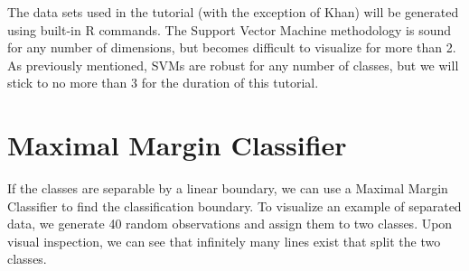 \documentclass[]{book}
\newenvironment{Shaded}{\begin{snugshade}}{\end{snugshade}}
\newcommand{\CommentTok}[1]{\textcolor[rgb]{0.56,0.35,0.01}{\textit{#1}}}
\newcommand{\DataTypeTok}[1]{\textcolor[rgb]{0.13,0.29,0.53}{#1}}
\newcommand{\DecValTok}[1]{\textcolor[rgb]{0.00,0.00,0.81}{#1}}
\newcommand{\FloatTok}[1]{\textcolor[rgb]{0.00,0.00,0.81}{#1}}
\newcommand{\KeywordTok}[1]{\textcolor[rgb]{0.13,0.29,0.53}{\textbf{#1}}}
\newcommand{\NormalTok}[1]{#1}
\newcommand{\OperatorTok}[1]{\textcolor[rgb]{0.81,0.36,0.00}{\textbf{#1}}}
\newcommand{\StringTok}[1]{\textcolor[rgb]{0.31,0.60,0.02}{#1}}
\begin{document}
The data sets used in the tutorial (with the exception of Khan) will be generated using built-in R commands. The Support Vector Machine methodology is sound for any number of dimensions, but becomes difficult to visualize for more than 2. As previously mentioned, SVMs are robust for any number of classes, but we will stick to no more than 3 for the duration of this tutorial.

\hypertarget{maximal-margin-classifier}{%
\section{Maximal Margin Classifier}\label{maximal-margin-classifier}}

If the classes are separable by a linear boundary, we can use a Maximal Margin Classifier to find the classification boundary. To visualize an example of separated data, we generate 40 random observations and assign them to two classes. Upon visual inspection, we can see that infinitely many lines exist that split the two classes.

\begin{Shaded}
\end{Shaded}
\end{document}
